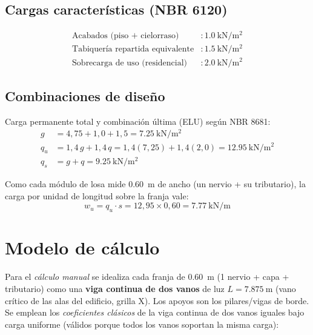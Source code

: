 \subsection{Cargas características (NBR 6120)}
\begin{align}
  \text{Acabados (piso + cielorraso)} &\colon \SI{1,0}{\kilo\newton\per\square\meter}\\
  \text{Tabiquería repartida equivalente} &\colon \SI{1,5}{\kilo\newton\per\square\meter}\\
  \text{Sobrecarga de uso (residencial)} &\colon \SI{2,0}{\kilo\newton\per\square\meter}
\end{align}

\subsection{Combinaciones de diseño}
Carga permanente total y combinación última (ELU) según NBR 8681:
\begin{align}
  g &= 4{,}75 + 1{,}0 + 1{,}5 = \SI{7,25}{\kilo\newton\per\square\meter}\\
  q_u &= 1{,}4\,g + 1{,}4\,q = 1{,}4(7{,}25) + 1{,}4(2{,}0)
        = \SI{12,95}{\kilo\newton\per\square\meter}\\
  q_s &= g + q = \SI{9,25}{\kilo\newton\per\square\meter}
\end{align}

Como cada módulo de losa mide \SI{0,60}{\meter} de ancho (un nervio +
su tributario), la carga por unidad de longitud sobre la franja vale:
\begin{equation}
  w_u = q_u \cdot s = 12{,}95 \times 0{,}60 = \SI{7,77}{\kilo\newton\per\meter}
\end{equation}

\section{Modelo de cálculo}
\label{sec:modelo}

Para el \emph{cálculo manual} se idealiza cada franja de \SI{0,60}{\meter}
(1 nervio + capa + tributario) como una \textbf{viga continua de dos
vanos} de luz $L = \SI{7,875}{\meter}$ (vano crítico de las alas del
edificio, grilla X). Los apoyos son los pilares/vigas de borde. Se
emplean los \emph{coeficientes clásicos} de la viga continua de dos
vanos iguales bajo carga uniforme (válidos porque todos los vanos
soportan la misma carga):

